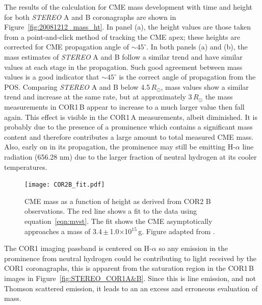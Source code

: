 The results of the calculation for CME mass development with time and height for both \emph{STEREO} A and B coronagraphs are shown in Figure~\ref{fig:20081212_mass_ht}. In panel (a), the height values are those taken from a point-and-click method of tracking the CME apex; these heights are corrected for CME propagation angle of $\sim$$45^{\circ}$.  In both panels (a) and (b), the mass estimates of \emph{STEREO} A and B follow a similar trend and have similar values at each stage in the propagation. Such good agreement between mass values is a good indicator that $\sim$$45^{\circ}$ is the correct angle of propagation from the POS. 
Comparing \emph{STEREO} A and B below 4.5\,$R_{\odot}$, mass values show a similar trend and increase at the same rate, but at approximately 3\,$R_{\odot}$ the mass measurements in COR1\,B appear to increase to a much larger value then fall again. This effect is visible in the COR1\,A measurements, albeit 
diminished. It is probably due to the presence of a prominence which contains a significant mass content and therefore contributes a large amount to total measured CME mass. Also, early on in its propagation, the prominence may still be emitting H-$\alpha$ line radiation (656.28 nm) due to the larger fraction of neutral hydrogen at its cooler temperatures.
\begin{figure}[!t]
\begin{center}
\texttt{[image: COR2B\_fit.pdf]}
\caption[CME mass as a function of height and time, COR2 B data only]{{\color{black}CME mass as a function of height as derived from COR2 B observations. The red line shows a fit to the data using equation~\ref{eqn:mvst}. The fit shows the CME asymptotically approaches a mass of 3.4\,$\pm$\,1.0$\times$10$^{15}$\,g. Figure adapted from \citet{carley2012}.}}
\label{fig:COR2B_fit}
\end{center}
\end{figure}
The COR1 imaging passband is centered on H-$\alpha$ so any emission in the prominence from neutral hydrogen could be contributing to light received by the COR1 coronagraphs, this is apparent from the saturation region in the COR1\,B images in Figure~\ref{fig:STEREO_COR1A&B}. Since this is line emission, and not Thomson scattered emission, it leads to an an excess and erroneous evaluation of mass.
